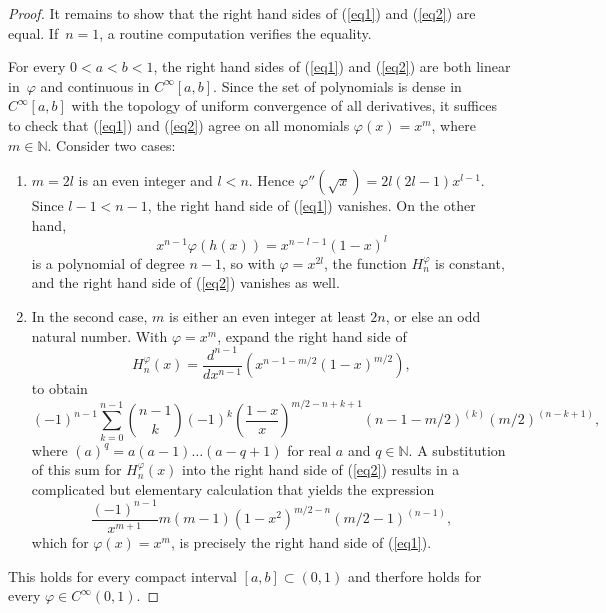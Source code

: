 \documentclass{article}[1100]
\theoremstyle{definition}
\theoremstyle{remark}
\begin{document}
\begin{proof}
It remains to show that the right hand sides of (\ref{eq1}) and (\ref{eq2}) are equal. If~${n=1}$, a routine computation verifies the equality.

\medskip

For every $0<a<b<1$, the right hand sides of  (\ref{eq1}) and (\ref{eq2}) are  both linear in~$\varphi$ and continuous in 
$C^{\infty}[a,b]$. Since the set of polynomials is dense in $C^{\infty}[a,b]$ with the topology of uniform convergence of all derivatives, it suffices to check that (\ref{eq1}) and (\ref{eq2})  agree on all monomials $\varphi(x)=x^m$, where $m\in\mathbb{N}$. Consider two cases:
\begin{enumerate}
\item[1.] $m=2l$ is an even integer and $l<n$. Hence $\varphi''(\sqrt{x})=2l(2l-1)x^{l-1}$. Since $l-1<n-1$, the right hand side of (\ref{eq1}) vanishes. On the other hand,
\[ x^{n-1}\varphi(h(x))=x^{n-l-1}(1-x)^l \]
is a polynomial of degree $n-1$, so with $\varphi=x^{2l}$, the function $H_n^\varphi$ is  constant, and the right hand side of (\ref{eq2}) vanishes as well.
\item[2.] In the second case,  $m$ is either an even integer at least $2n$, or else an odd natural number. With $\varphi=x^m$, expand the right hand side of 
\[ H_n^\varphi(x)=\frac{d^{n-1}}{dx^{n-1}}(x^{n-1-m/2}(1-x)^{m/2}), \]
to obtain
\[ (-1)^{n-1}\sum_{k=0}^{n-1}{n-1\choose k}(-1)^k(\frac{1-x}{x})^{m/2-n+k+1}(n-1-m/2)^{(k)}(m/2)^{(n-k+1)},\]
where  $(a)^q=a(a-1)\dots (a-q+1)$ for real $a$ and $q\in\mathbb{N}$. 
A substitution of this sum for $H_n^\varphi(x)$ into the right hand side of (\ref{eq2}) results in a complicated but elementary calculation that yields the expression 
\begin{equation}\label{final}
\frac{(-1)^{n-1}}{x^{m+1}}m(m-1)(1-x^2)^{m/2-n}(m/2-1)^{(n-1)}, 
\end{equation}
which for  $\varphi(x)=x^m$, is precisely the right hand side of (\ref{eq1}). 
\end{enumerate}
This holds for every compact interval $[a,b]\subset (0,1)$ and therfore holds for every ${\varphi\in C^{\infty}(0,1)}$.
\end{proof}
\end{document}
